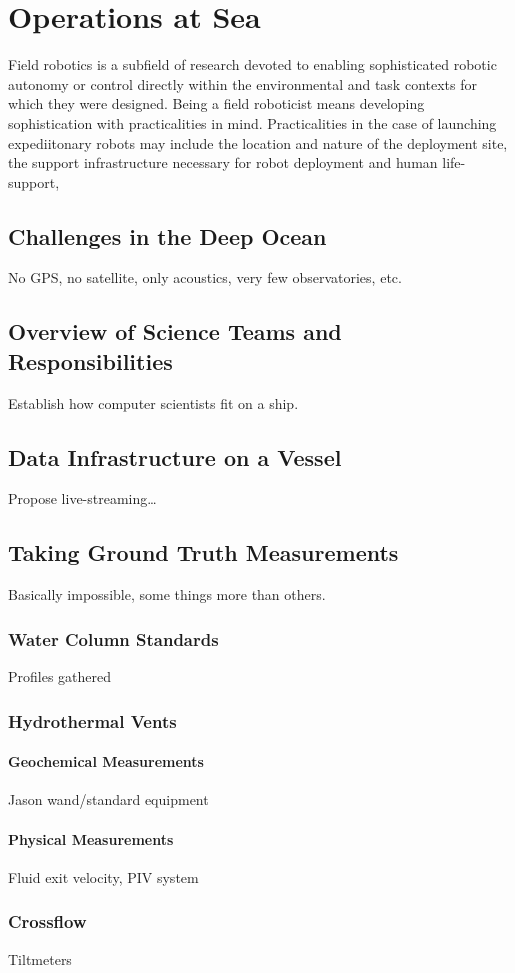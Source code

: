 \chapter{Operations at Sea}

Field robotics is a subfield of research devoted to enabling sophisticated robotic autonomy or control directly within the environmental and task contexts for which they were designed.
Being a field roboticist means developing sophistication with practicalities in mind.
Practicalities in the case of launching expediitonary robots may include the location and nature of the deployment site, the support infrastructure necessary for robot deployment and human life-support, 

 
\section{Challenges in the Deep Ocean}
No GPS, no satellite, only acoustics, very few observatories, etc.

\section{Overview of Science Teams and Responsibilities}
Establish how computer scientists fit on a ship.

\section{Data Infrastructure on a Vessel}
Propose live-streaming\dots

\section{Taking Ground Truth Measurements}
Basically impossible, some things more than others.

\subsection{Water Column Standards}
Profiles gathered

\subsection{Hydrothermal Vents}

\subsubsection{Geochemical Measurements}
Jason wand/standard equipment

\subsubsection{Physical Measurements}
Fluid exit velocity, PIV system

\subsection{Crossflow}
Tiltmeters
